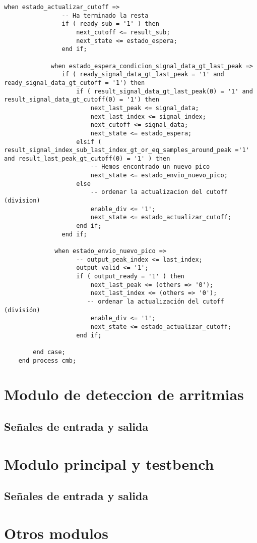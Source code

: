 \begin{lstlisting}[frame=single]
            when estado_actualizar_cutoff =>
                -- Ha terminado la resta
                if ( ready_sub = '1' ) then
                    next_cutoff <= result_sub;
                    next_state <= estado_espera;
                end if;                
                
             when estado_espera_condicion_signal_data_gt_last_peak =>
                if ( ready_signal_data_gt_last_peak = '1' and ready_signal_data_gt_cutoff = '1') then
                    if ( result_signal_data_gt_last_peak(0) = '1' and result_signal_data_gt_cutoff(0) = '1') then
                        next_last_peak <= signal_data;
                        next_last_index <= signal_index;
                        next_cutoff <= signal_data;
                        next_state <= estado_espera;
                    elsif ( result_signal_index_sub_last_index_gt_or_eq_samples_around_peak ='1' and result_last_peak_gt_cutoff(0) = '1' ) then                     
                        -- Hemos encontrado un nuevo pico
                        next_state <= estado_envio_nuevo_pico;
                    else
                        -- ordenar la actualizacion del cutoff (division)
                        enable_div <= '1';
                        next_state <= estado_actualizar_cutoff;
                    end if;
                end if;
                
              when estado_envio_nuevo_pico =>
                    -- output_peak_index <= last_index;
                    output_valid <= '1';
                    if ( output_ready = '1' ) then
                        next_last_peak <= (others => '0');
                        next_last_index <= (others => '0');
                       -- ordenar la actualización del cutoff (división)
                        enable_div <= '1';
                        next_state <= estado_actualizar_cutoff;
                    end if;
                
        end case;
    end process cmb;
\end{lstlisting}

\section{Modulo de deteccion de arritmias}


\subsection{Señales de entrada y salida}

\section{Modulo principal y testbench}

\subsection{Señales de entrada y salida}

\section{Otros modulos}



